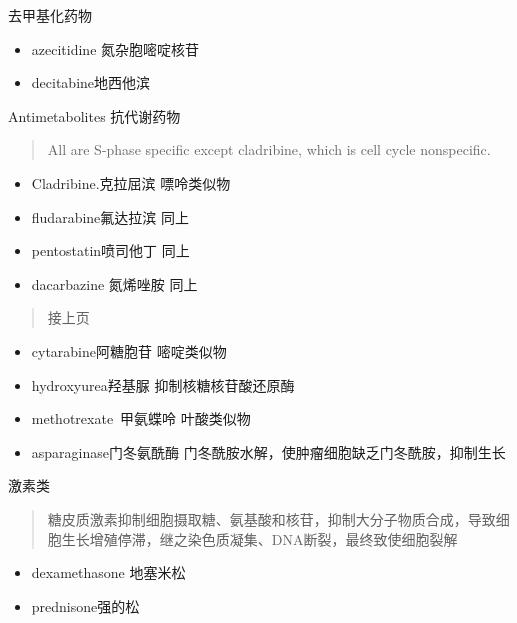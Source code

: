 \documentclass[
  ignorenonframetext,
]{beamer}
\begin{document}
\begin{frame}
\begin{block}{去甲基化药物}
\protect\hypertarget{ux53bbux7532ux57faux5316ux836fux7269}{}
\begin{itemize}
\item
  azecitidine 氮杂胞嘧啶核苷
\item
  decitabine地西他滨
\end{itemize}
\end{block}
\end{frame}

\begin{frame}
\begin{block}{Antimetabolites 抗代谢药物}
\protect\hypertarget{antimetabolites-ux6297ux4ee3ux8c22ux836fux7269}{}
\begin{quote}
All are S-phase specific except cladribine, which is cell cycle
nonspecific.
\end{quote}

\begin{itemize}
\item
  Cladribine.克拉屈滨 嘌呤类似物
\item
  fludarabine氟达拉滨 同上
\item
  pentostatin喷司他丁 同上
\item
  dacarbazine 氮烯唑胺 同上
\end{itemize}
\end{block}
\end{frame}

\begin{frame}
\begin{quote}
接上页
\end{quote}

\begin{itemize}
\item
  cytarabine阿糖胞苷 嘧啶类似物
\item
  hydroxyurea羟基脲 抑制核糖核苷酸还原酶
\item
  methotrexate~甲氨蝶呤 叶酸类似物
\item
  asparaginase门冬氨酰酶 门冬酰胺水解，使肿瘤细胞缺乏门冬酰胺，抑制生长
\end{itemize}
\end{frame}

\begin{frame}
\begin{block}{激素类}
\protect\hypertarget{ux6fc0ux7d20ux7c7b}{}
\begin{quote}
糖皮质激素抑制细胞摄取糖、氨基酸和核苷，抑制大分子物质合成，导致细胞生长增殖停滞，继之染色质凝集、DNA断裂，最终致使细胞裂解
\end{quote}

\begin{itemize}
\item
  dexamethasone 地塞米松
\item
  prednisone强的松
\end{itemize}
\end{block}
\end{frame}
\end{document}
